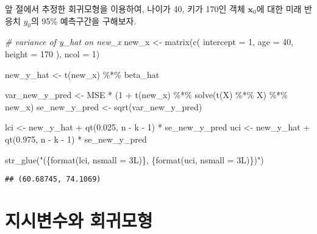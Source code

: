 \documentclass[
]{book}
\newenvironment{Shaded}{\begin{snugshade}}{\end{snugshade}}
\newcommand{\AttributeTok}[1]{\textcolor[rgb]{0.77,0.63,0.00}{#1}}
\newcommand{\CommentTok}[1]{\textcolor[rgb]{0.56,0.35,0.01}{\textit{#1}}}
\newcommand{\DecValTok}[1]{\textcolor[rgb]{0.00,0.00,0.81}{#1}}
\newcommand{\FloatTok}[1]{\textcolor[rgb]{0.00,0.00,0.81}{#1}}
\newcommand{\FunctionTok}[1]{\textcolor[rgb]{0.00,0.00,0.00}{#1}}
\newcommand{\NormalTok}[1]{#1}
\newcommand{\OtherTok}[1]{\textcolor[rgb]{0.56,0.35,0.01}{#1}}
\newcommand{\SpecialCharTok}[1]{\textcolor[rgb]{0.00,0.00,0.00}{#1}}
\newcommand{\StringTok}[1]{\textcolor[rgb]{0.31,0.60,0.02}{#1}}
\begin{document}
앞 절에서 추정한 회귀모형을 이용하여, 나이가 40, 키가 170인 객체 \(\mathbf{x}_0\)에 대한 미래 반응치 \(y_0\)의 95\% 예측구간을 구해보자.

\begin{Shaded}
\begin{Highlighting}[]
\CommentTok{\# variance of y\_hat on new\_x}
\NormalTok{new\_x }\OtherTok{\textless{}{-}} \FunctionTok{matrix}\NormalTok{(}\FunctionTok{c}\NormalTok{(}
  \AttributeTok{intercept =} \DecValTok{1}\NormalTok{,}
  \AttributeTok{age =} \DecValTok{40}\NormalTok{,}
  \AttributeTok{height =} \DecValTok{170}
\NormalTok{), }\AttributeTok{ncol =} \DecValTok{1}\NormalTok{)}

\NormalTok{new\_y\_hat }\OtherTok{\textless{}{-}} \FunctionTok{t}\NormalTok{(new\_x) }\SpecialCharTok{\%*\%}\NormalTok{ beta\_hat}

\NormalTok{var\_new\_y\_pred }\OtherTok{\textless{}{-}}\NormalTok{ MSE }\SpecialCharTok{*}\NormalTok{ (}\DecValTok{1} \SpecialCharTok{+} \FunctionTok{t}\NormalTok{(new\_x) }\SpecialCharTok{\%*\%} \FunctionTok{solve}\NormalTok{(}\FunctionTok{t}\NormalTok{(X) }\SpecialCharTok{\%*\%}\NormalTok{ X) }\SpecialCharTok{\%*\%}\NormalTok{ new\_x)}
\NormalTok{se\_new\_y\_pred }\OtherTok{\textless{}{-}} \FunctionTok{sqrt}\NormalTok{(var\_new\_y\_pred)}

\NormalTok{lci }\OtherTok{\textless{}{-}}\NormalTok{ new\_y\_hat }\SpecialCharTok{+} \FunctionTok{qt}\NormalTok{(}\FloatTok{0.025}\NormalTok{, n }\SpecialCharTok{{-}}\NormalTok{ k }\SpecialCharTok{{-}} \DecValTok{1}\NormalTok{) }\SpecialCharTok{*}\NormalTok{ se\_new\_y\_pred}
\NormalTok{uci }\OtherTok{\textless{}{-}}\NormalTok{ new\_y\_hat }\SpecialCharTok{+} \FunctionTok{qt}\NormalTok{(}\FloatTok{0.975}\NormalTok{, n }\SpecialCharTok{{-}}\NormalTok{ k }\SpecialCharTok{{-}} \DecValTok{1}\NormalTok{) }\SpecialCharTok{*}\NormalTok{ se\_new\_y\_pred}

\FunctionTok{str\_glue}\NormalTok{(}\StringTok{"(\{format(lci, nsmall = 3L)\}, \{format(uci, nsmall = 3L)\})"}\NormalTok{)}
\end{Highlighting}
\end{Shaded}

\begin{verbatim}
## (60.68745, 74.1069)
\end{verbatim}

\hypertarget{regression-indicator-variable}{%
\section{지시변수와 회귀모형}\label{regression-indicator-variable}}
\end{document}
